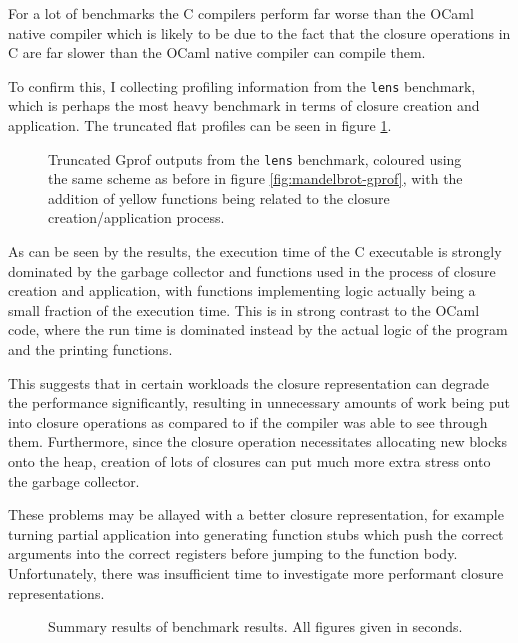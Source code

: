 \documentclass[12pt,a4paper,twoside,openright]{report}
\begin{document}
For a lot of benchmarks the C compilers perform far worse than the OCaml native 
compiler which is likely to be due to the fact that the closure operations in C 
are far slower than the OCaml native compiler can compile them.

To confirm this, I collecting profiling information from the \texttt{lens} 
benchmark, which is perhaps the most heavy benchmark in terms of closure 
creation and application. The truncated flat profiles can be seen in figure 
\ref{fig:closure-creation}.

\begin{figure}
    \label{fig:closure-creation}
    \centering
    
    \caption{Truncated Gprof outputs from the \texttt{lens} benchmark, coloured 
    using the same scheme as before in figure \ref{fig:mandelbrot-gprof}, with 
    the addition of yellow functions being related to the closure 
    creation/application process.}
\end{figure}

As can be seen by the results, the execution time of the C executable is 
strongly dominated by the garbage collector and functions used in the process 
of closure creation and application, with functions implementing logic actually 
being a small fraction of the execution time. This is in strong contrast to the 
OCaml code, where the run time is dominated instead by the actual logic of the 
program and the printing functions.

This suggests that in certain workloads the closure representation can degrade 
the performance significantly, resulting in unnecessary amounts of work being 
put into closure operations as compared to if the compiler was able to see 
through them. Furthermore, since the closure operation necessitates allocating 
new blocks onto the heap, creation of lots of closures can put much more extra 
stress onto the garbage collector.

These problems may be allayed with a better closure representation, for example 
turning partial application into generating function stubs which push the 
correct arguments into the correct registers before jumping to the function 
body. Unfortunately, there was insufficient time to investigate more performant 
closure representations.

\begin{figure}
    \centering
    \resizebox{\textwidth}{!}{
        
    }
    \caption{Summary results of benchmark results. All figures given in 
    seconds.}
\end{figure}
\end{document}
